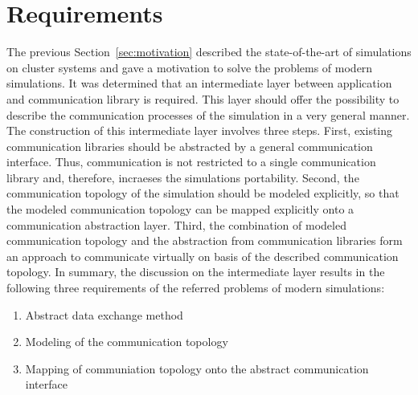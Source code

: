 

\section{Requirements}
\label{sec:requirements}

The previous Section~\ref{sec:motivation} described the state-of-the-art
of simulations on cluster systems and gave a motivation to solve
the problems of modern simulations.
It was determined that an intermediate layer between application and
communication library is required.  This layer should offer the
possibility to describe the communication processes of the simulation
in a very general manner.  The construction of this intermediate layer
involves three steps.  First, existing communication libraries should
be abstracted by a general communication interface. Thus,
communication is not restricted to a single communication library and,
therefore, incraeses the simulations portability.  Second, the
communication topology of the simulation should be modeled explicitly,
so that the modeled communication topology can be mapped explicitly
onto a communication abstraction layer.  Third, the combination of
modeled communication topology and the abstraction from communication
libraries form an approach to communicate virtually on basis of the
described communication topology.  In summary, the discussion on the
intermediate layer results in the following three requirements of the
referred problems of modern simulations:

\begin{enumerate}
\item Abstract data exchange method
\item Modeling of the communication topology
\item Mapping of communiation topology onto the abstract communication interface
\end{enumerate}



